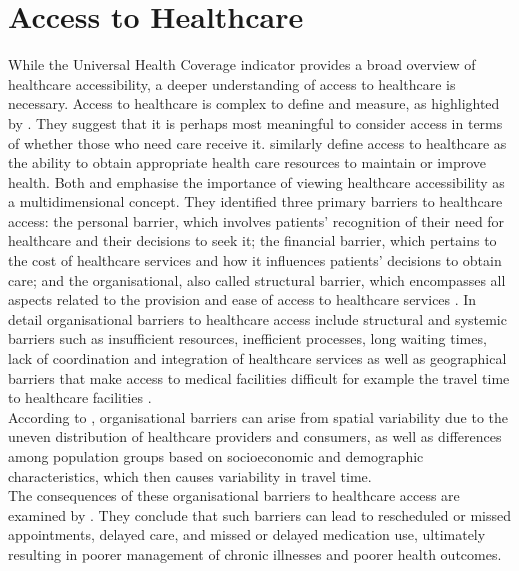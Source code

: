 \documentclass[11pt, a4paper]{report}
\begin{document}
\section{Access to Healthcare}\label{sec:introaccess}
While the Universal Health Coverage indicator provides a broad overview of healthcare accessibility, a deeper understanding of access to healthcare is necessary. Access to healthcare is complex to define and measure, as highlighted by \citet{aday_framework_1974}. They suggest that it is perhaps most meaningful to consider access in terms of whether those who need care receive it. \citet{gulliford_what_2002} similarly define access to healthcare as the ability to obtain appropriate health care resources to maintain or improve health. Both \citet{aday_framework_1974} and \citet{gulliford_what_2002} emphasise the importance of viewing healthcare accessibility as a multidimensional concept. They identified three primary barriers to healthcare access: the personal barrier, which involves patients' recognition of their need for healthcare and their decisions to seek it; the financial barrier, which pertains to the cost of healthcare services and how it influences patients' decisions to obtain care; and the organisational, also called structural barrier, which encompasses all aspects related to the provision and ease of access to healthcare services \citet{gulliford_what_2002}. In detail organisational barriers to healthcare access include structural and systemic barriers such as insufficient resources, inefficient processes, long waiting times, lack of coordination and integration of healthcare services as well as geographical barriers that make access to medical facilities difficult for example the travel time to healthcare facilities \citet{carrillo_defining_2011}.\\
%
According to \citet{wang_assessing_2005}, organisational barriers can arise from spatial variability due to the uneven distribution of healthcare providers and consumers, as well as differences among population groups based on socioeconomic and demographic characteristics, which then causes variability in travel time. \\
%
The consequences of these organisational barriers to healthcare access are examined by \citet{syed_traveling_2013}. They conclude that such barriers can lead to rescheduled or missed appointments, delayed care, and missed or delayed medication use, ultimately resulting in poorer management of chronic illnesses and poorer health outcomes. 
\end{document}
